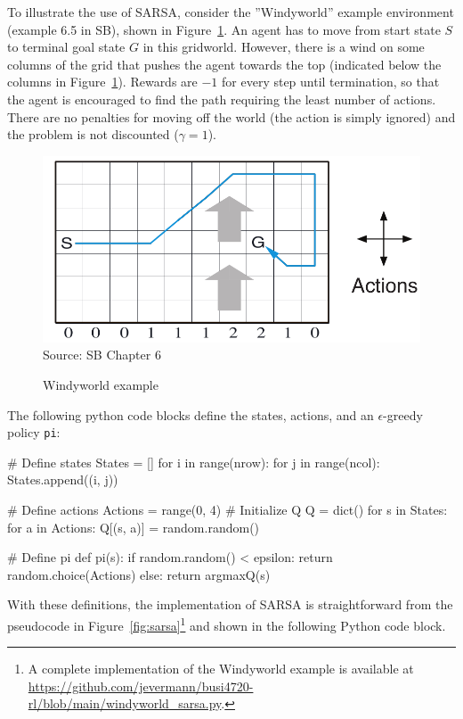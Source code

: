 To illustrate the use of SARSA, consider the ''Windyworld'' example environment (example 6.5 in SB), shown in Figure~\ref{fig:windyworld}. An agent has to move from start state $S$ to terminal goal state $G$ in this gridworld. However, there is a wind on some columns of the grid that pushes the agent towards the top (indicated below the columns in Figure~\ref{fig:windyworld}). Rewards are $-1$ for every step until termination, so that the agent is encouraged to find the path requiring the least number of actions. There are no penalties for moving off the world (the action is simply ignored) and the problem is not discounted ($\gamma=1$).


\begin{figure}
\centering
\includegraphics[width=.5\textwidth]{screen6} \\
\scriptsize Source: SB Chapter 6 \normalsize 
\caption{Windyworld example}
\label{fig:windyworld}
\end{figure}

The following python code blocks define the states, actions, and an $\epsilon$-greedy policy \texttt{pi}:

\begin{samepage}
\begin{pythoncode}
# Define states
States = []
for i in range(nrow):
    for j in range(ncol):
        States.append((i, j))

# Define actions
Actions = range(0, 4)
# Initialize Q
Q = dict()
for s in States:
    for a in Actions:
        Q[(s, a)] = random.random()

# Define pi
def pi(s):
    if random.random() < epsilon:
        return random.choice(Actions)
    else:
        return argmaxQ(s)
\end{pythoncode}
\end{samepage}

With these definitions, the implementation of SARSA is straightforward from the pseudocode in Figure~\ref{fig:sarsa}\footnote{A complete implementation of the Windyworld example is available at \url{https://github.com/jevermann/busi4720-rl/blob/main/windyworld_sarsa.py}.} and shown in the following Python code block.

